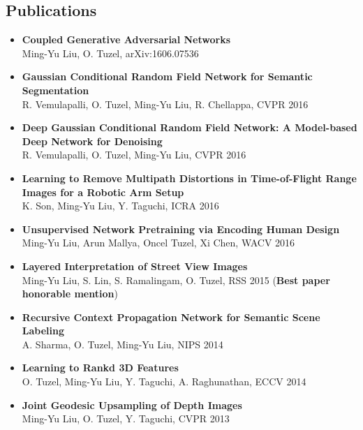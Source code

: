 \documentclass[10pt,letterpaper]{article}
\begin{document}
\subsection*{Publications}
\begin{itemize}
\item {\bf Coupled Generative Adversarial Networks}\\
      Ming-Yu Liu, O. Tuzel, arXiv:1606.07536\vspace{-2mm}
\item {\bf Gaussian Conditional Random Field Network for Semantic Segmentation}\\
      R. Vemulapalli, O. Tuzel, Ming-Yu Liu, R. Chellappa, CVPR 2016\vspace{-2mm}
\item {\bf Deep Gaussian Conditional Random Field Network: A Model-based Deep Network for Denoising}\\
      R. Vemulapalli, O. Tuzel, Ming-Yu Liu, CVPR 2016\vspace{-2mm}
\item {\bf Learning to Remove Multipath Distortions in Time-of-Flight Range Images for a Robotic Arm Setup}\\
      K. Son, Ming-Yu Liu, Y. Taguchi, ICRA 2016\vspace{-2mm}
\item {\bf Unsupervised Network Pretraining via Encoding Human Design}\\
      Ming-Yu Liu, Arun Mallya, Oncel Tuzel, Xi Chen, WACV 2016\vspace{-2mm}
\item {\bf Layered Interpretation of Street View Images}\\
      Ming-Yu Liu, S. Lin, S. Ramalingam, O. Tuzel, RSS 2015 ({\bf Best paper honorable mention})\vspace{-2mm}
\item {\bf Recursive Context Propagation Network for Semantic Scene Labeling}\\
			A. Sharma, O. Tuzel, {Ming-Yu Liu}, {NIPS} 2014\vspace{-2mm}
\item {\bf Learning to Rankd 3D Features}\\
			O. Tuzel, {Ming-Yu Liu}, Y. Taguchi, A. Raghunathan, {ECCV} 2014\vspace{-2mm}
\item {\bf Joint Geodesic Upsampling of Depth Images}\\      
      {Ming-Yu Liu}, O. Tuzel, Y. Taguchi, {CVPR} 2013\vspace{-2mm}

\end{itemize}
\end{document}
